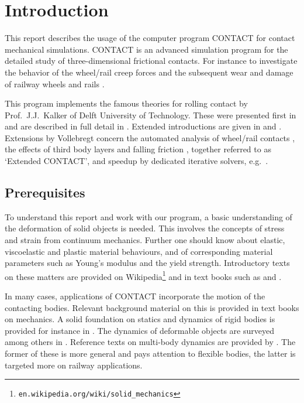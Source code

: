 \documentclass[12pt]{report}
\begin{document}
\clearpage


\chapter{Introduction}
\label{chp:introduction}

This report describes the usage of the computer program CONTACT for contact
mechanical simulations. CONTACT is an advanced simulation program for the
detailed study of three-dimensional frictional contacts. For instance to
investigate the behavior of the wheel/rail creep forces and the subsequent
wear and damage of railway wheels and rails \cite{Meymand2016a-review,
Vollebregt2021a-soa-paper}.

This program implements the famous theories for rolling contact by Prof.\
J.J.\ Kalker of Delft University of Technology. These were presented first
in \cite{Kalker1979a} and are described in full detail in
\cite{Kalker1990}. Extended introductions are given in \cite{Kalker2000}
and \cite{Vollebregt2011a-assessm}. Extensions by Vollebregt concern the
automated analysis of wheel/rail contacts \cite{Vollebregt2020b-wrgeom,
Vollebregt2020c-distr-force, Vollebregt2022b-cm2022}, the effects of third
body layers \cite{Vollebregt2014c-tractcurv,Vollebregt2019a-fra} and
falling friction \cite{Vollebregt2012a-quasistd}, together referred to as
`Extended CONTACT', and speedup by dedicated iterative solvers, e.g.\
\cite{Vollebregt2014a-fftprec,Zhao_Jing2015a-tangcg}.

\section{Prerequisites}

To understand this report and work with our program, a basic understanding
of the deformation of solid objects is needed. This involves the concepts
of stress and strain from continuum mechanics. Further one should know
about elastic, viscoelastic and plastic material behaviours, and of
corresponding material parameters such as Young's modulus and the yield
strength. Introductory texts on these matters are provided on
Wikipedia\footnote{{\tt en.wikipedia.org/wiki/solid\_mechanics}} and in
text books such as \cite{Bower2008} and \cite{Naghdi2001}.

In many cases, applications of CONTACT incorporate the motion of the contacting
bodies. Relevant background material on this is provided in text books on
mechanics. A solid foundation on statics and dynamics of rigid bodies is
provided for instance in \cite{Hibbeler2012}. The dynamics of deformable
objects are surveyed among others in \cite{Craig2006}. Reference texts on
multi-body dynamics are provided by \cite{Shabana2013,Shabana2008}. The
former of these is more general and pays attention to flexible bodies, the
latter is targeted more on railway applications.
\end{document}

